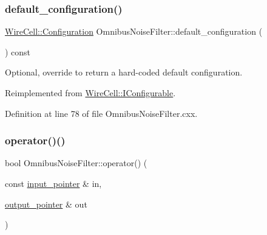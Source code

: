 \mbox{\label{class_wire_cell_1_1_sig_proc_1_1_omnibus_noise_filter_afb8457ee3c6181bfeee597b11fe8e4f7}} 
\subsubsection{\texorpdfstring{default\+\_\+configuration()}{default\_configuration()}}
{\footnotesize\ttfamily \hyperlink{namespace_wire_cell_a9f705541fc1d46c608b3d32c182333ee}{Wire\+Cell\+::\+Configuration} Omnibus\+Noise\+Filter\+::default\+\_\+configuration (\begin{DoxyParamCaption}{ }\end{DoxyParamCaption}) const\hspace{0.3cm}{\ttfamily [virtual]}}



Optional, override to return a hard-\/coded default configuration. 



Reimplemented from \hyperlink{class_wire_cell_1_1_i_configurable_a54841b2da3d1ea02189478bff96f7998}{Wire\+Cell\+::\+I\+Configurable}.



Definition at line 78 of file Omnibus\+Noise\+Filter.\+cxx.

\mbox{\label{class_wire_cell_1_1_sig_proc_1_1_omnibus_noise_filter_a861a76be3558adf47d2f7da5b00357f1}} 
\subsubsection{\texorpdfstring{operator()()}{operator()()}}
{\footnotesize\ttfamily bool Omnibus\+Noise\+Filter\+::operator() (\begin{DoxyParamCaption}\item[{const \hyperlink{class_wire_cell_1_1_i_function_node_a55c0946156df9b712b8ad1a0b59b2db6}{input\+\_\+pointer} \&}]{in,  }\item[{\hyperlink{class_wire_cell_1_1_i_function_node_afc02f1ec60d31aacddf64963f9ca650b}{output\+\_\+pointer} \&}]{out }\end{DoxyParamCaption})\hspace{0.3cm}{\ttfamily [virtual]}}



